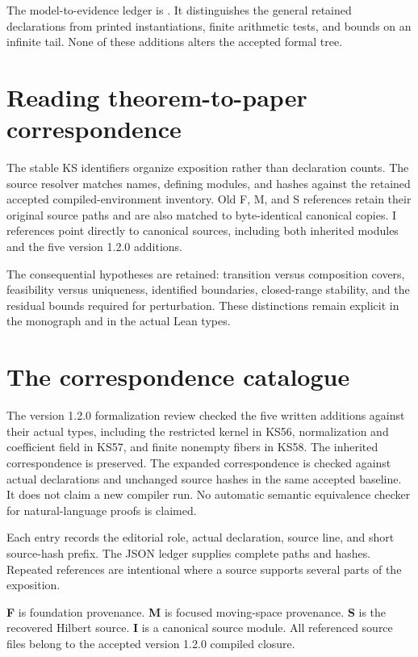 \documentclass[11pt]{article}
\begin{document}
The model-to-evidence ledger is . It distinguishes the general retained declarations from printed instantiations, finite arithmetic tests, and bounds on an infinite tail. None of these additions alters the accepted formal tree.

\section{Reading theorem-to-paper correspondence}
The stable KS identifiers organize exposition rather than declaration counts. The source resolver matches names, defining modules, and hashes against the retained accepted compiled-environment inventory. Old F, M, and S references retain their original source paths and are also matched to byte-identical canonical copies. I references point directly to canonical sources, including both inherited modules and the five version 1.2.0 additions.

The consequential hypotheses are retained: transition versus composition covers, feasibility versus uniqueness, identified boundaries, closed-range stability, and the residual bounds required for perturbation. These distinctions remain explicit in the monograph and in the actual Lean types.

\clearpage\section{The correspondence catalogue}
The version 1.2.0 formalization review checked the five written additions against their actual types, including the restricted kernel in KS56, normalization and coefficient field in KS57, and finite nonempty fibers in KS58. The inherited correspondence is preserved. The expanded correspondence is checked against actual declarations and unchanged source hashes in the same accepted baseline. It does not claim a new compiler run. No automatic semantic equivalence checker for natural-language proofs is claimed.

Each entry records the editorial role, actual declaration, source line, and short source-hash prefix. The JSON ledger supplies complete paths and hashes. Repeated references are intentional where a source supports several parts of the exposition.

\textbf{F} is foundation provenance. \textbf{M} is focused moving-space provenance. \textbf{S} is the recovered Hilbert source. \textbf{I} is a canonical source module. All referenced source files belong to the accepted version 1.2.0 compiled closure.

\end{document}
